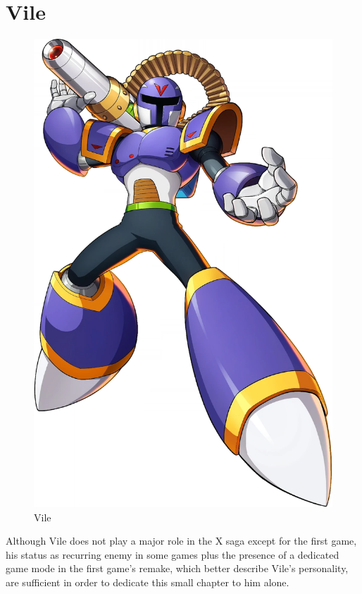\chapter{Vile}\label{char:Vile}
\begin{figure}[htp]
	\centering
	\includegraphics[height=\BIGportraitsize]{figures/X1/Sigma_stages/X_DiVE_Vile.png}	
	\caption{Vile}
\end{figure}

Although Vile does not play a major role in the X saga except for the first game, his status as recurring enemy in some games plus the presence of a dedicated game mode in the first game's remake, which better describe Vile's personality, are sufficient in order to dedicate this small chapter to him alone. 

